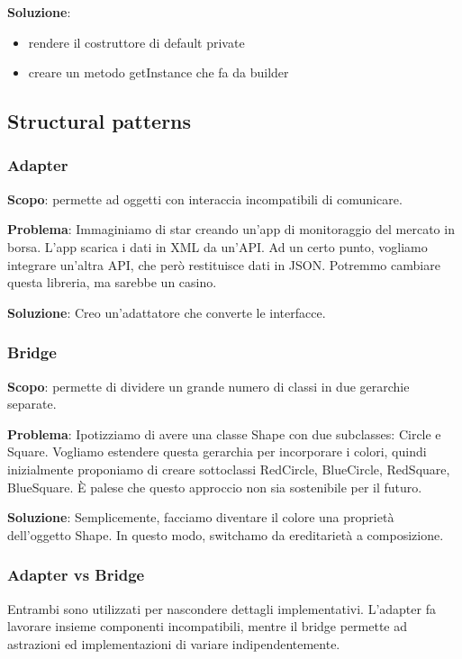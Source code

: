 \documentclass{article}
\begin{document}
\textbf{Soluzione}: 
\begin{itemize}
    \item rendere il costruttore di default private
    \item creare un metodo getInstance che fa da builder
\end{itemize}


\subsection{Structural patterns}
\subsubsection{Adapter}
\textbf{Scopo}: permette ad oggetti con interaccia incompatibili di comunicare.

\textbf{Problema}: Immaginiamo di star creando un'app di monitoraggio del mercato in borsa. L'app scarica i
dati in XML da un'API. Ad un certo punto, vogliamo integrare un'altra API, che però restituisce dati in
JSON. Potremmo cambiare questa libreria, ma sarebbe un casino.

\textbf{Soluzione}: Creo un'adattatore che converte le interfacce.

\subsubsection{Bridge}
\textbf{Scopo}: permette di dividere un grande numero di classi in due 
gerarchie separate.

\textbf{Problema}: Ipotizziamo di avere una classe Shape con due subclasses: Circle e Square. Vogliamo
estendere questa gerarchia per incorporare i colori, quindi inizialmente proponiamo di creare sottoclassi
RedCircle, BlueCircle, RedSquare, BlueSquare. È palese che questo approccio non sia sostenibile per il
futuro.

\textbf{Soluzione}: Semplicemente, facciamo diventare il colore una proprietà dell'oggetto Shape. In questo modo,
switchamo da ereditarietà a composizione.

\subsubsection{Adapter vs Bridge}
Entrambi sono utilizzati per nascondere dettagli implementativi. L'adapter fa lavorare insieme componenti
incompatibili, mentre il bridge permette ad astrazioni ed implementazioni di variare indipendentemente.
\end{document}
